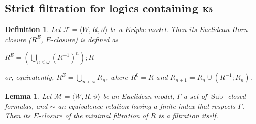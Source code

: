 \documentclass[a4paper]{article}
\theoremstyle{defin}
\newtheorem{defin}{Definition}
\theoremstyle{theorem}
\theoremstyle{prop}
\theoremstyle{lemma}
\newtheorem{lemma}{Lemma}
\theoremstyle{ex}
\theoremstyle{col}
\begin{document}
\subsection{Strict filtration for logics containing ${\bf K5}$}

\begin{defin}
  Let $\mathcal{F} = \langle W, R, \vartheta \rangle$ be a Kripke model. Then its Euclidean Horn closure ($R^E$, $E$-closure) is defined as
  \begin{center}
    $R^E = (\bigcup \limits_{n < \omega} (R^{-1})^n); R$
  \end{center}
  or, equivalently, $R^{E} = \bigcup \limits_{n < \omega} R_n$, where $R^{0} = R$ and $R_{n + 1} = R_n \cup (R^{-1} ; R_n)$.
\end{defin}

\begin{lemma}
  Let $\mathcal{M} = \langle W, R, \vartheta \rangle$ be an Euclidean model, $\Gamma$ a set of $\operatorname{Sub}$-closed formulas, and $\sim$ an equivalence relation having a finite index that respects $\Gamma$. Then its $E$-closure of the minimal filtration of $R$ is a filtration itself.
\end{lemma}
\end{document}

